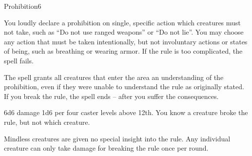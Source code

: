 \begin{spellsection}{Prohibition}{6}
\begin{spellheader}
\end{spellheader}
\begin{spellcontent}
    \spelleffect You loudly declare a prohibition on single, specific action which creatures must not take, such as ``Do not use ranged weapons'' or ``Do not lie''. You may choose any action that must be taken intentionally, but not involuntary actions or states of being, such as breathing or wearing armor. If the rule is too complicated, the spell fails.

    The spell grants all creatures that enter the area an understanding of the prohibition, even if they were unable to understand the rule as originally stated. If you break the rule, the spell ends -- after you suffer the consequences.
    \spelldur \durshort
\end{spellcontent}
\begin{spellsubcontent}
    \begin{spelltargetinginfo}
    \end{spelltargetinginfo}
    \begin{spelleffects}
        \spelleffect 6d6 damage \add 1d6 per four caster levels above 12th. You know a creature broke the rule, but not which creature.
    \end{spelleffects}
\end{spellsubcontent}
\begin{spellfooter}
    \spellnotes Mindless creatures are given no special insight into the rule. Any individual creature can only take damage for breaking the rule once per round.
\end{spellfooter}
\end{spellsection}

